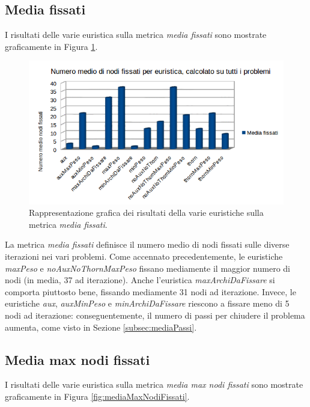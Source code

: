 \subsection{Media fissati}
I risultati delle varie euristica sulla metrica \textit{media fissati} sono mostrate graficamente in Figura \ref{fig:mediaFissati}.

\begin{figure}[H]
\includegraphics[width=\textwidth]{res/img/nodiFissati.png}
\caption{Rappresentazione grafica dei risultati della varie euristiche sulla metrica \textit{media fissati}.}
\label{fig:mediaFissati}
\end{figure}

La metrica \textit{media fissati} definisce il numero medio di nodi fissati sulle diverse iterazioni nei vari problemi. Come accennato precedentemente, le euristiche \textit{maxPeso} e \textit{noAuxNoThornMaxPeso} fissano mediamente il maggior numero di nodi (in media, 37 ad iterazione). Anche l'euristica \textit{maxArchiDaFissare} si comporta piuttosto bene, fissando mediamente 31 nodi ad iterazione. Invece, le euristiche \textit{aux}, \textit{auxMinPeso} e \textit{minArchiDaFissare} riescono a fissare meno di 5 nodi ad iterazione: conseguentemente, il numero di passi per chiudere il problema aumenta, come visto in Sezione \ref{subsec:mediaPassi}.

\subsection{Media max nodi fissati}
I risultati delle varie euristica sulla metrica \textit{media max nodi fissati} sono mostrate graficamente in Figura \ref{fig:mediaMaxNodiFissati}.

